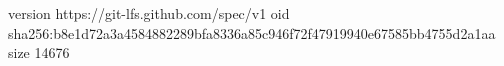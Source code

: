 version https://git-lfs.github.com/spec/v1
oid sha256:b8e1d72a3a4584882289bfa8336a85c946f72f47919940e67585bb4755d2a1aa
size 14676
